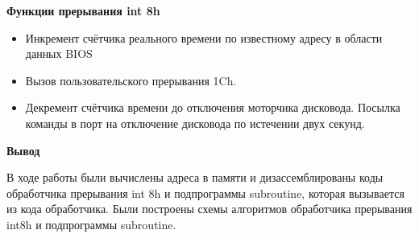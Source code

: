 \begin{center}
	{\bf\normalsize Функции прерывания int 8h}
\end{center}

\begin{itemize}
	\item Инкремент счётчика реального времени по известному адресу в области данных BIOS
	\item Вызов пользовательского прерывания 1Ch.
	\item Декремент счётчика времени до отключения моторчика дисковода. Посылка команды в порт на отключение дисковода по истечении двух секунд.
\end{itemize}

\begin{center}
	{\bf\normalsize Вывод}
\end{center}

В ходе работы были вычислены адреса в памяти и дизассемблированы коды обработчика прерывания int 8h и подпрограммы subroutine, 
которая вызывается из кода обработчика. 
Были построены схемы алгоритмов обработчика прерывания int8h и подпрограммы subroutine.